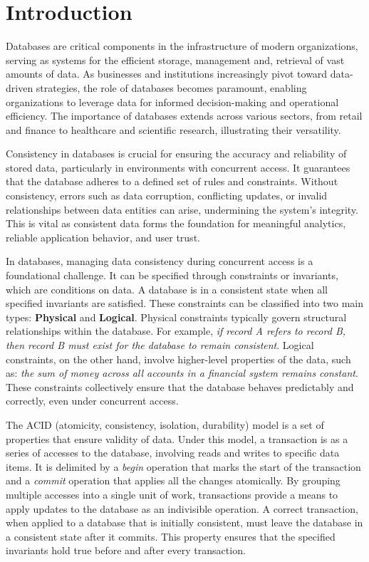 %


\chapter{Introduction} \label{chap:intro}
\adjustmtc

Databases are critical components in the infrastructure of modern organizations, serving as systems for the efficient storage, management and, retrieval of vast amounts of data. As businesses and institutions increasingly pivot toward data-driven strategies, the role of databases becomes paramount, enabling organizations to leverage data for informed decision-making and operational efficiency. The importance of databases extends across various sectors, from retail and finance to healthcare and scientific research, illustrating their versatility.


Consistency in databases is crucial for ensuring the accuracy and reliability of stored data, particularly in environments with concurrent access. It guarantees that the database adheres to a defined set of rules and constraints. Without consistency, errors such as data corruption, conflicting updates, or invalid relationships between data entities can arise, undermining the system's integrity. This is vital as consistent data forms the foundation for meaningful analytics, reliable application behavior, and user trust.

In databases, managing data consistency during concurrent access is a foundational challenge. It can be specified through constraints or invariants, which are conditions on data. A database is in a consistent state when all specified invariants are satisfied. These constraints can be classified into two main types: \textbf{Physical} and \textbf{Logical}. Physical constraints typically govern structural relationships within the database. For example, \emph{if record A refers to record B, then record B must exist for the database to remain consistent}. Logical constraints, on the other hand, involve higher-level properties of the data, such as: \emph{the sum of money across all accounts in a financial system remains constant}. These constraints collectively ensure that the database behaves predictably and correctly, even under concurrent access.

The ACID (atomicity, consistency, isolation, durability) model is a set of properties that ensure validity of data. Under this model, a transaction is as a series of accesses to the database, involving reads and writes to specific data items. It is delimited by a \emph{begin} operation that marks the start of the transaction and a \emph{commit} operation that applies all the changes atomically. By grouping multiple accesses into a single unit of work, transactions provide a means to apply updates to the database as an indivisible operation. A correct transaction, when applied to a database that is initially consistent, must leave the database in a consistent state after it commits. This property ensures that the specified invariants hold true before and after every transaction.

